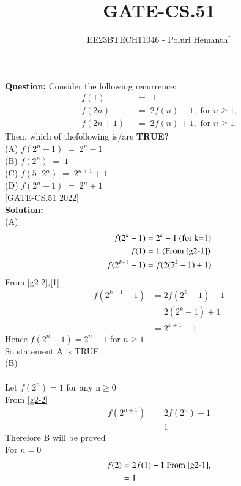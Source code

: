 \documentclass[journal,12pt,twocolumn]{IEEEtran}
\theoremstyle{remark}
\begin{document}

\vspace{3cm}

\title{GATE-CS.51}
\author{EE23BTECH11046 - Poluri Hemanth$^{*}$}
\maketitle
\textbf{Question:}
Consider the following recurrence:
\begin{align}
	f(1)\;\;&=\;\;1;\label{g2-1}\\
	 f(2n)\;\;&=\;2f(n)-1,\text{  for $n\geq$1;}\label{g2-2}\\
	 f(2n+1)\;\;&=\;2f(n)+1,\text{  for $n\geq$1.}\label{g2-3}
\end{align}
Then, which of thefollowing is/are \textbf{TRUE?}\\
(A) $f(2^n-1)\;=\;2^n-1$\\
(B) $f(2^n)\;=\;1$\\
(C) $f(5\cdot2^n)\;=\;2^{n+1}+1$\\
(D) $f(2^n+1)\;=\;2^n+1$\\
\hfill{[GATE-CS.51 2022]}\\
\textbf{Solution:}\\
(A)
\begin{align}
	f(2^k-1)&=2^k-1\text{ (for k=1)}\\
		f(1)&=1\text{ (From \eqref{g2-1})}\\
	f(2^{k+1}-1)&=f(2(2^k-1)+1)\label{1}
\end{align}
From \eqref{g2-2},\eqref{1}
\begin{align}
	f(2^{k+1}-1)&=2f(2^k-1)+1\\
        &=2(2^k-1)+1\\
        &=2^{k+1}-1
\end{align}
Hence $f(2^n-1)=2^n-1$ for $n\geq1$\\
So statement A is TRUE\\
(B)\\
\\Let $f(2^n)=1$ for any n$\geq$0\\
From \eqref{g2-2}
\begin{align}
	f(2^{n+1})&=2f(2^n)-1\\
	&=1
\end{align}
Therefore B will be proved\\
For $n=0$
\begin{align}
	f(2)&=2f(1)-1\text{  From  \eqref{g2-1},}\\
	&=1
\end{align}
\end{document}
